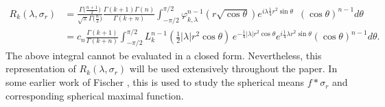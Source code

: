 \documentclass[11pt, reqno]{amsart}
\theoremstyle{plain}
\theoremstyle{remark}
\theoremstyle{example}
\theoremstyle{definition}
\numberwithin{equation}{section}
\begin{document}
\begin{equation}\label{Formula for coeficients of FT of sigma}
   \begin{split}
   R_k(\lambda, \sigma_r) & = \frac{\Gamma\big(\frac{n+1}{2}\big)}{\sqrt{\pi}\Gamma\big(\frac{n}{2}\big)}   \frac{\Gamma(k+1) \Gamma(n)}{\Gamma(k+n)} \int_{-\pi /2}^{\pi/2} \varphi_{k,\lambda}^{n-1}(r \sqrt{\cos \theta}) e^{i \lambda \frac{1}{4}r^2 \sin \theta} \,\,\, (\cos \theta)^{n-1} d \theta \\
     & =   c_{n} \frac{\Gamma(k+1)}{\Gamma(k+n)} \int_{- \pi/2}^{\pi/2} L_{k}^{n-1} \left( {\textstyle\frac{1}{2} } |\lambda |  r^2  \cos{\theta}  \right) \, e^{-\frac{1}{4}  |\lambda| r^2 \cos{\theta}}  e^{i \frac{1}{4} \lambda r^2\sin{\theta}} (\cos{\theta})^{n-1} d \theta.
   \end{split}
\end{equation}
The above integral cannot be evaluated in a closed form. Nevertheless, this representation of $R_{k}(\lambda, \sigma_{r})$ will be used extensively throughout the paper. In some earlier work of Fischer \cite{VF}, this is used to study the spherical means $ f \ast \sigma_r$ and corresponding spherical maximal function.
\end{document}

